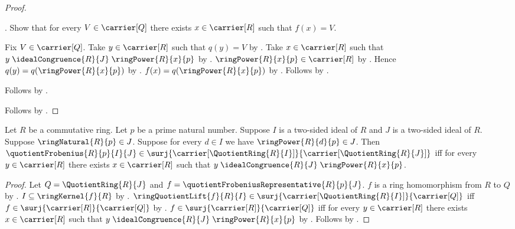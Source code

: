 \begin{proof}
\begin{subproof}
            .
        Show that for every $V\in\carrier[Q]$ there exists
            $x\in\carrier[R]$ such that $f(x)=V$.
        \begin{subproof}
            Fix $V\in\carrier[Q]$.
            Take $y\in\carrier[R]$ such that $q(y)=V$ by
                .
            Take $x\in\carrier[R]$ such that
                $y\mathrel{\idealCongruence{R}{J}}
                    \ringPower{R}{x}{p}$ by \auto.
            $\ringPower{R}{x}{p}\in\carrier[R]$ by
                .
            Hence $q(y)=q(\ringPower{R}{x}{p})$ by
                .
            $f(x)=q(\ringPower{R}{x}{p})$ by
                .
            Follows by \auto.
        \end{subproof}
        Follows by .
    \end{subproof}
    Follows by \auto.
\end{proof}

\begin{theorem}\label{quotient_frobenius_surjective_iff}
    Let $R$ be a commutative ring.
    Let $p$ be a prime natural number.
    Suppose $I$ is a two-sided ideal of $R$ and
        $J$ is a two-sided ideal of $R$.
    Suppose $\ringNatural{R}{p}\in J$.
    Suppose for every $d\in I$ we have
        $\ringPower{R}{d}{p}\in J$.
    Then $\quotientFrobenius{R}{p}{I}{J}\in
        \surj{\carrier[\QuotientRing{R}{I}]}{
            \carrier[\QuotientRing{R}{J}]}$ iff
        for every $y\in\carrier[R]$ there exists $x\in\carrier[R]$
            such that
            $y\mathrel{\idealCongruence{R}{J}}
                \ringPower{R}{x}{p}$.
\end{theorem}
\begin{proof}
    Let $Q=\QuotientRing{R}{J}$ and
        $f=\quotientFrobeniusRepresentative{R}{p}{J}$.
    $f$ is a ring homomorphism from $R$ to $Q$ by
        .
    $I\subseteq\ringKernel{f}{R}$ by
        .
    $\ringQuotientLift{f}{R}{I}\in
        \surj{\carrier[\QuotientRing{R}{I}]}{\carrier[Q]}$ iff
        $f\in\surj{\carrier[R]}{\carrier[Q]}$ by
        .
    $f\in\surj{\carrier[R]}{\carrier[Q]}$ iff
        for every $y\in\carrier[R]$ there exists $x\in\carrier[R]$
            such that
            $y\mathrel{\idealCongruence{R}{J}}
                \ringPower{R}{x}{p}$ by
        .
    Follows by .
\end{proof}

